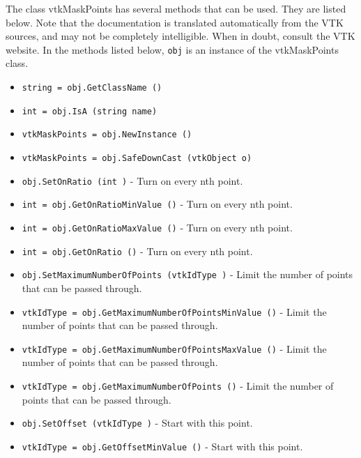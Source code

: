 The class vtkMaskPoints has several methods that can be used.
  They are listed below.
Note that the documentation is translated automatically from the VTK sources,
and may not be completely intelligible.  When in doubt, consult the VTK website.
In the methods listed below, \verb|obj| is an instance of the vtkMaskPoints class.
\begin{itemize}
\item  \verb|string = obj.GetClassName ()|

\item  \verb|int = obj.IsA (string name)|

\item  \verb|vtkMaskPoints = obj.NewInstance ()|

\item  \verb|vtkMaskPoints = obj.SafeDownCast (vtkObject o)|

\item  \verb|obj.SetOnRatio (int )| -  Turn on every nth point.

\item  \verb|int = obj.GetOnRatioMinValue ()| -  Turn on every nth point.

\item  \verb|int = obj.GetOnRatioMaxValue ()| -  Turn on every nth point.

\item  \verb|int = obj.GetOnRatio ()| -  Turn on every nth point.

\item  \verb|obj.SetMaximumNumberOfPoints (vtkIdType )| -  Limit the number of points that can be passed through.

\item  \verb|vtkIdType = obj.GetMaximumNumberOfPointsMinValue ()| -  Limit the number of points that can be passed through.

\item  \verb|vtkIdType = obj.GetMaximumNumberOfPointsMaxValue ()| -  Limit the number of points that can be passed through.

\item  \verb|vtkIdType = obj.GetMaximumNumberOfPoints ()| -  Limit the number of points that can be passed through.

\item  \verb|obj.SetOffset (vtkIdType )| -  Start with this point.

\item  \verb|vtkIdType = obj.GetOffsetMinValue ()| -  Start with this point.


\end{itemize}
